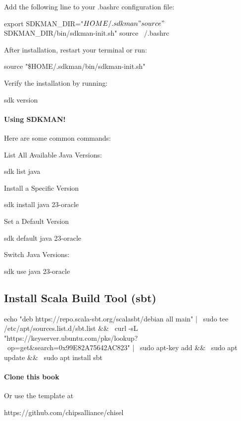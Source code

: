 Add the following line to your .bashrc configuration file:
\begin{bashcode}
export SDKMAN_DIR="$HOME/.sdkman"
source "$SDKMAN_DIR/bin/sdkman-init.sh"
source ~/.bashrc
\end{bashcode}

After installation, restart your terminal or run:
\begin{bashcode}
    source "\$HOME/.sdkman/bin/sdkman-init.sh"        
\end{bashcode}

Verify the installation by running:
\begin{bashcode}
 sdk version    
\end{bashcode}       

\paragraph*{Using SDKMAN!}
Here are some common commands:

List All Available Java Versions:
\begin{bashcode}    
sdk list java
\end{bashcode}

Install a Specific Version
\begin{bashcode}
sdk install java 23-oracle   
\end{bashcode}

Set a Default Version
\begin{bashcode}
sdk default java 23-oracle    
\end{bashcode}

Switch Java Versions:
\begin{bashcode}
sdk use java 23-oracle    
\end{bashcode}

\subsection{Install Scala Build Tool (sbt)}
\begin{bashcode}
echo "deb https://repo.scala-sbt.org/scalasbt/debian all main" | \
sudo tee /etc/apt/sources.list.d/sbt.list && \
curl -sL "https://keyserver.ubuntu.com/pks/lookup? \ 
op=get&search=0x99E82A75642AC823" | \
sudo apt-key add && \
sudo apt update && \
sudo apt install sbt
\end{bashcode}


\paragraph{Clone this book}
Or use the template at 
\begin{bashcode}
https://github.com/chipsalliance/chisel
\end{bashcode}

